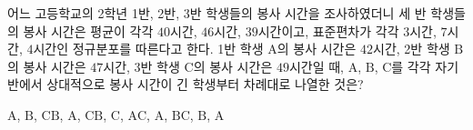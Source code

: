 어느 고등학교의 2학년 1반, 2반, 3반 학생들의 봉사 시간을 조사하였더니 세 반 학생들의 봉사 시간은 평균이 각각 $40$시간, $46$시간, $39$시간이고, 표준편차가 각각 $3$시간, $7$시간, $4$시간인 정규분포를 따른다고 한다. 1반 학생 $\mathrm{A}$의 봉사 시간은 $42$시간, 2반 학생 $\mathrm{B}$의 봉사 시간은 $47$시간, 3반 학생 $\mathrm{C}$의 봉사 시간은 $49$시간일 때, $\mathrm{A}$, $\mathrm{B}$, $\mathrm{C}$를 각각 자기 반에서 상대적으로 봉사 시간이 긴 학생부터 차례대로 나열한 것은?
\begin{choices32}{$\mathrm{A}$, $\mathrm{B}$, $\mathrm{C}$}{$\mathrm{B}$, $\mathrm{A}$, $\mathrm{C}$}{$\mathrm{B}$, $\mathrm{C}$, $\mathrm{A}$}{$\mathrm{C}$, $\mathrm{A}$, $\mathrm{B}$}{$\mathrm{C}$, $\mathrm{B}$, $\mathrm{A}$}\end{choices32}
